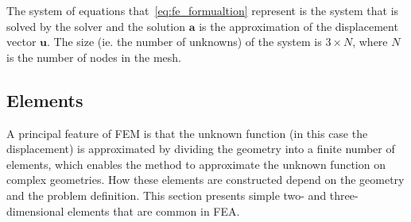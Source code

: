 The system of equations that~\eqref{eq:fe_formualtion} represent is the system that is solved by the solver and the solution $\mathbf{a}$ is the approximation of the displacement vector $\mathbf{u}$. The size (ie. the number of unknowns) of the system is $3\times N$, where $N$ is the number of nodes in the mesh.

\subsection{Elements} %
\label{sub:elements}
A principal feature of FEM is that the unknown function (in this case the displacement) is approximated by dividing the geometry into a finite number of elements, which enables the method to approximate the unknown function on complex geometries. How these elements are constructed depend on the geometry and the problem definition. This section presents simple two- and three-dimensional elements that are common in FEA.

